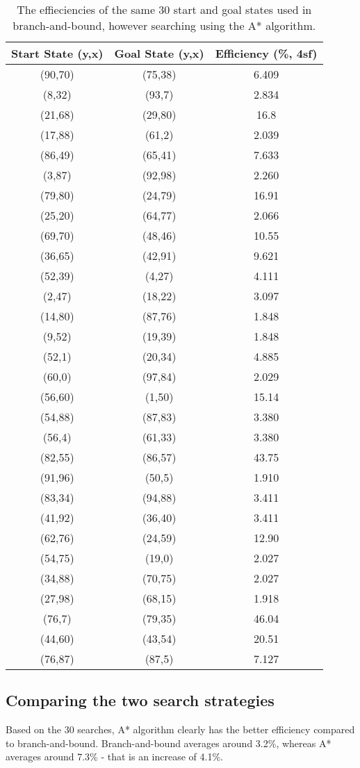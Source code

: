 \documentclass[11pt,oneside]{article}
\begin{document}
\begin{table}[ht]
    \centering
    \begin{tabular}{|c|c|c|}
	Start State (y,x)&Goal State (y,x)&Efficiency (\%, 4sf) \\ \hline
	(90,70)&(75,38)&6.409 \\
	(8,32)&(93,7)&2.834 \\
	(21,68)&(29,80)&16.8 \\
	(17,88)&(61,2)&2.039 \\
	(86,49)&(65,41)&7.633 \\
	(3,87)&(92,98)&2.260 \\
	(79,80)&(24,79)&16.91 \\
	(25,20)&(64,77)&2.066 \\
	(69,70)&(48,46)&10.55 \\
	(36,65)&(42,91)&9.621 \\
	(52,39)&(4,27)&4.111 \\
	(2,47)&(18,22)&3.097 \\
	(14,80)&(87,76)&1.848 \\
	(9,52)&(19,39)&1.848 \\
	(52,1)&(20,34)&4.885 \\
	(60,0)&(97,84)&2.029 \\
	(56,60)&(1,50)&15.14 \\
	(54,88)&(87,83)&3.380 \\
	(56,4)&(61,33)&3.380 \\
	(82,55)&(86,57)&43.75 \\
	(91,96)&(50,5)&1.910 \\
	(83,34)&(94,88)&3.411 \\
	(41,92)&(36,40)&3.411 \\
	(62,76)&(24,59)&12.90 \\
	(54,75)&(19,0)&2.027 \\
	(34,88)&(70,75)&2.027\\
	(27,98)&(68,15)&1.918 \\
	(76,7)&(79,35)&46.04 \\
	(44,60)&(43,54)&20.51 \\
	(76,87)&(87,5)&7.127 \\

    \end{tabular}
    \caption{The effieciencies of the same 30 start and goal states used in branch-and-bound, however searching using the A* algorithm.}
    \label{tab:astareff}
\end{table}

\subsection{Comparing the two search strategies}
Based on the 30 searches, A* algorithm clearly has the better efficiency compared to branch-and-bound. Branch-and-bound averages around 3.2\%, whereas A* averages around 7.3\% - that is an increase of 4.1\%.
\end{document}
